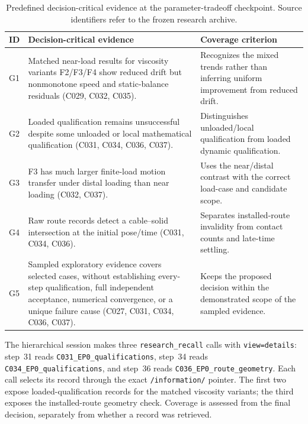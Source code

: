 \documentclass[10pt]{article}
\newcommand{\papertablestyle}{\fontsize{9}{11}\selectfont\setlength{\tabcolsep}{4pt}\renewcommand{\arraystretch}{1.05}}
\begin{document}
\begin{table}[H]
\centering
\caption{Predefined decision-critical evidence at the parameter-tradeoff checkpoint. Source identifiers refer to the frozen research archive.}
\label{tab:context-evidence-checklist}
\papertablestyle
\begin{tabularx}{\textwidth}{@{}>{\raggedright\arraybackslash}p{}>{\raggedright\arraybackslash}p{}Y@{}}
\toprule
\textbf{ID} & \textbf{Decision-critical evidence} & \textbf{Coverage criterion} \\
\midrule
G1 & Matched near-load results for viscosity variants F2/F3/F4 show reduced drift but nonmonotone speed and static-balance residuals (C029, C032, C035). & Recognizes the mixed trends rather than inferring uniform improvement from reduced drift. \\
G2 & Loaded qualification remains unsuccessful despite some unloaded or local mathematical qualification (C031, C034, C036, C037). & Distinguishes unloaded/local qualification from loaded dynamic qualification. \\
G3 & F3 has much larger finite-load motion transfer under distal loading than near loading (C032, C037). & Uses the near/distal contrast with the correct load-case and candidate scope. \\
G4 & Raw route records detect a cable--solid intersection at the initial pose/time (C031, C034, C036). & Separates installed-route invalidity from contact counts and late-time settling. \\
G5 & Sampled exploratory evidence covers selected cases, without establishing every-step qualification, full independent acceptance, numerical convergence, or a unique failure cause (C027, C031, C034, C036, C037). & Keeps the proposed decision within the demonstrated scope of the sampled evidence. \\
\bottomrule
\end{tabularx}
\end{table}

{\raggedright The hierarchical session makes three \texttt{research\_recall} calls with \texttt{view=details}: step~31 reads \texttt{C031\_EP0\_qualifications}, step~34 reads \texttt{C034\_EP0\_qualifications}, and step~36 reads \texttt{C036\_EP0\_route\_geometry}. Each call selects its record through the exact \texttt{/information/} pointer. The first two expose loaded-qualification records for the matched viscosity variants; the third exposes the installed-route geometry check. Coverage is assessed from the final decision, separately from whether a record was retrieved.\par}
\end{document}
